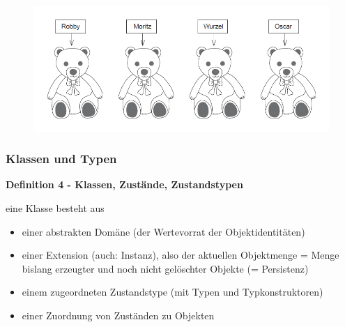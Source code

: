 \begin{figure}[!h]
	\centering
	\includegraphics[scale=0.5]{img/struc_2.png}
\end{figure}

\subsubsection{Klassen und Typen}
\begin{framed}
	\textbf{Definition 4 - Klassen, Zustände, Zustandstypen}
	\begin{description}
		\item eine Klasse besteht aus
		\begin{itemize}
			\item einer abstrakten Domäne (der Wertevorrat der Objektidentitäten)
			\item einer Extension (auch: Instanz), also der aktuellen Objektmenge = Menge bislang erzeugter und noch nicht gelöschter Objekte (= Persistenz)
			\item einem zugeordneten Zustandstype (mit Typen und Typkonstruktoren)
			\item einer Zuordnung von Zuständen zu Objekten
		\end{itemize}
	\end{description}	
\end{framed}
